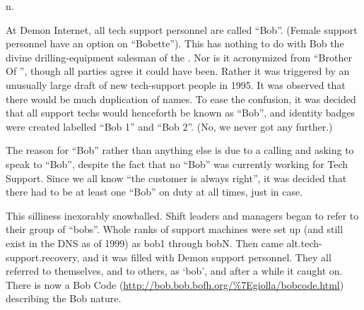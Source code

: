  n.

At Demon Internet, all tech support personnel
are called ``Bob''. (Female support personnel have an option on ``Bobette'').
This has nothing to do with Bob the divine drilling-equipment salesman of the
. Nor is it acronymized from ``Brother Of
'', though all parties agree it could have been. Rather it was
triggered by an unusually large draft of new tech-support people in 1995. It was
observed that there would be much duplication of names. To ease the confusion,
it was decided that all support techs would henceforth be known as ``Bob'', and
identity badges were created labelled ``Bob 1'' and ``Bob 2''. (No, we never got
any further.)

The reason for ``Bob'' rather than anything else is due to a 
calling and asking to speak to ``Bob'', despite the fact that no ``Bob'' was
currently working for Tech Support. Since we all know ``the customer is always
right'', it was decided that there had to be at least one ``Bob'' on duty at all
times, just in case.

This silliness
inexorably snowballed. Shift leaders and managers began to refer to their group
of ``bobs''. Whole ranks of support machines were set up (and still exist in the
DNS as of 1999) as bob1 through bobN. Then came alt.tech-support.recovery, and
it was filled with Demon support personnel. They all referred to themselves, and
to others, as `bob', and after a while it caught on. There is now a
Bob Code (\url{http://bob.bob.bofh.org/\%7Egiolla/bobcode.html}) describing the
Bob nature.

